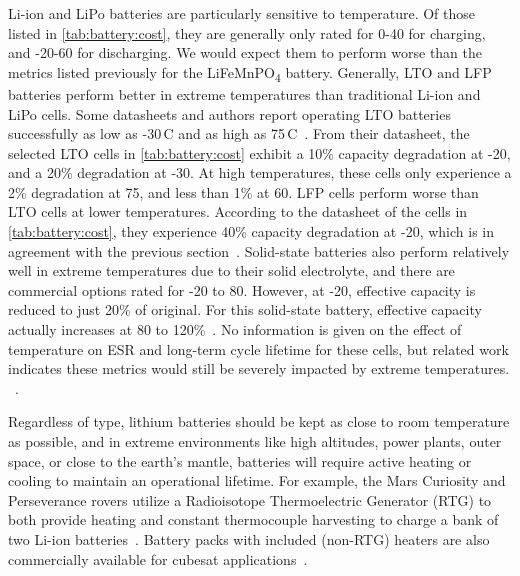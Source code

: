 Li-ion and LiPo batteries are particularly sensitive to temperature. Of those listed in \cref{tab:battery:cost}, they are generally only rated for 0-40\ssi{\celsius} for charging, and -20-60\ssi{\celsius} for discharging. We would expect them to perform worse than the metrics listed previously for the LiFeMnPO\textsubscript{4} battery.
Generally, LTO and LFP batteries perform better in extreme temperatures than traditional Li-ion and LiPo cells.
Some 
datasheets and authors report operating LTO batteries successfully as low as -30\,\textdegree C
and as high as 75\,\textdegree C~\cite{LTODatasheet2, lifepo4Datasheet, chenEvaluation15}. From their datasheet, the selected LTO cells in \cref{tab:battery:cost} exhibit a 10\% capacity degradation at -20\ssi{\celsius}, and a 20\% degradation at -30\ssi{\celsius}. At high temperatures, these cells only experience a 2\% degradation at 75\ssi{\celsius}, and less than 1\% at 60\ssi{\celsius}. LFP cells perform worse than LTO cells at lower temperatures. According to the datasheet of the cells in \cref{tab:battery:cost}, they experience 40\% capacity degradation at -20\ssi{\celsius}, which is in agreement with the previous section~\cite{lifepo4Datasheet, jaguemont2015lithium}. Solid-state batteries also perform relatively well in extreme temperatures due to their solid electrolyte, and there are commercial options rated for -20 to 80\ssi{\celsius}. However, at -20\ssi{\celsius}, effective capacity is reduced to just 20\% of original. For this solid-state battery, effective capacity actually increases at 80\ssi{\celsius} to 120\%~\cite{tdkCeraCharge}.
No information is given on the effect of temperature on ESR and long-term cycle lifetime for these cells, but related work indicates these metrics would still be severely impacted by extreme temperatures.
~\cite{wangCycle11, swierczynskiInvestigation14}.

Regardless of type, lithium batteries should be kept as close to room temperature as possible, and in extreme environments like high altitudes, power plants, outer space, or close to the earth's mantle, batteries will require active heating or cooling to maintain an operational lifetime. For example, the Mars Curiosity and Perseverance rovers utilize a Radioisotope Thermoelectric Generator (RTG) to both provide heating and constant thermocouple harvesting to charge a bank of two Li-ion batteries~\cite{nasaPerseverance}. Battery packs with included (non-RTG) heaters are also commercially available for cubesat applications~\cite{nanopowerbpx}.

